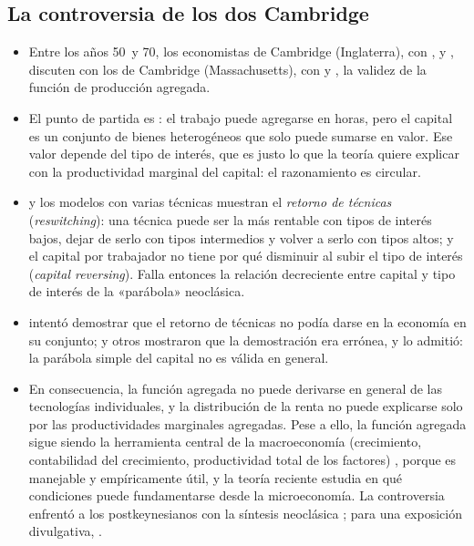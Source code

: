 \documentclass[11pt]{article}
\begin{document}
\subsection{La controversia de los dos Cambridge}\label{anexo:controversia-dos-cambridge}

\begin{itemize}
\item Entre los años 50~y 70, los economistas de Cambridge (Inglaterra), con ,  y , discuten con los de Cambridge (Massachusetts), con  y , la validez de la función de producción agregada\nocite{CohenHarcourt2003Whatever}.
\item El punto de partida es \textcite{Robinson1953Production}: el trabajo puede agregarse en horas, pero el capital es un conjunto de bienes heterogéneos que solo puede sumarse en valor. Ese valor depende del tipo de interés, que es justo lo que la teoría quiere explicar con la productividad marginal del capital: el razonamiento es circular.
\item \textcite{Sraffa1960Production} y los modelos con varias técnicas muestran el \emph{retorno de técnicas} (\emph{reswitching}): una técnica puede ser la más rentable con tipos de interés bajos, dejar de serlo con tipos intermedios y volver a serlo con tipos altos; y el capital por trabajador no tiene por qué disminuir al subir el tipo de interés (\emph{capital reversing}). Falla entonces la relación decreciente entre capital y tipo de interés de la «parábola» neoclásica.
\item \textcite{Levhari1965Nonswitching} intentó demostrar que el retorno de técnicas no podía darse en la economía en su conjunto; \textcite{Pasinetti1966Changes} y otros mostraron que la demostración era errónea, y \textcite{Samuelson1966Summing} lo admitió: la parábola simple del capital no es válida en general.
\item En consecuencia, la función agregada no puede derivarse en general de las tecnologías individuales, y la distribución de la renta no puede explicarse solo por las productividades marginales agregadas. Pese a ello, la función agregada sigue siendo la herramienta central de la macroeconomía (crecimiento, contabilidad del crecimiento, productividad total de los factores) , porque es manejable y empíricamente útil, y la teoría reciente estudia en qué condiciones puede fundamentarse desde la microeconomía\nocite{BaqaeeFarhi2019Microeconomic}. La controversia enfrentó a los postkeynesianos con la síntesis neoclásica ; para una exposición divulgativa, \textcite{Feas2017Robinson}.
\end{itemize}
\end{document}
